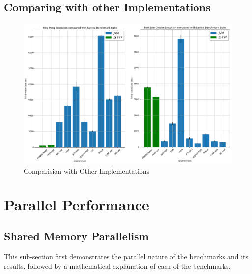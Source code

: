 \documentclass[12pt, a4paper]{report}
\theoremstyle{definition}
\theoremstyle{definition}%
\theoremstyle{definition}%
\theoremstyle{definition}%
\theoremstyle{definition}%
\theoremstyle{definition}%
\begin{document}
\subsection{Comparing with other Implementations}
\begin{figure}[H]
    \begin{centering}
        \includegraphics[width=\textwidth]{resources/savina.png}
        \caption{Comparision with Other Implementations}
    \end{centering}
\end{figure}
\section{Parallel Performance}
\subsection{Shared Memory Parallelism}
This sub-section first demonstrates the parallel nature of the benchmarks and its results, followed by a mathematical explanation of each of the benchmarks.
\end{document}
